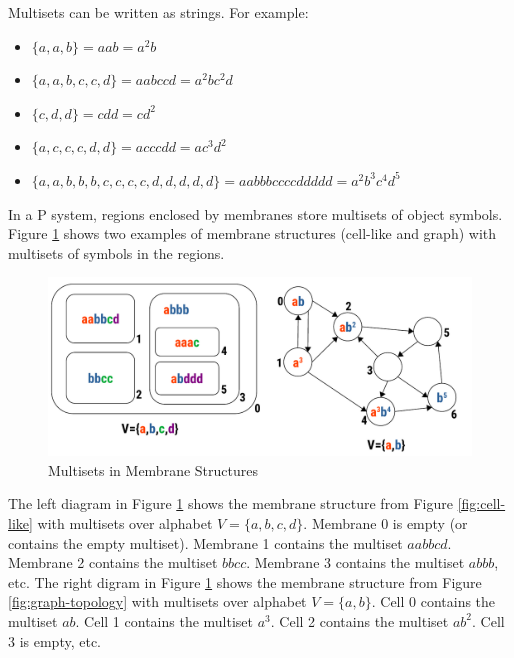\documentclass{article}
\begin{document}
Multisets can be written as strings. For example:

\begin{itemize}
\item $\{a,a,b\} = aab = a^2b$
\item $\{a,a,b,c,c,d\} = aabccd = a^2bc^2d$
\item $\{c,d,d\} = cdd = cd^2$
\item $\{a,c,c,c,d,d\} = acccdd = ac^3d^2$
\item $\{a,a,b,b,b,c,c,c,c,d,d,d,d,d\}= aabbbccccddddd=a^2b^3c^4d^5$
\end{itemize}

In a P system, regions enclosed by membranes store multisets of object symbols. Figure 
\ref{fig:multisets-on-membranes} shows two examples of membrane structures (cell-like and graph) 
with multisets of symbols in the  regions.

\begin{figure}[H]
\begin{center}
\includegraphics[scale=0.55]{figures/zzz-multisets-on-membranes.pdf}
\caption{Multisets in Membrane Structures}
\label{fig:multisets-on-membranes}
\end{center}
\end{figure}

The left diagram in Figure \ref{fig:multisets-on-membranes} shows the membrane structure from Figure
\ref{fig:cell-like} with multisets over alphabet $V=\{a,b,c,d\}$. Membrane 0 is empty (or contains 
the empty multiset). Membrane 1 contains the multiset $aabbcd$. Membrane 2 contains the multiset
$bbcc$. Membrane 3 contains the multiset $abbb$, etc. The right digram in Figure 
\ref{fig:multisets-on-membranes} shows the membrane structure from Figure \ref{fig:graph-topology} 
with multisets over alphabet $V=\{a,b\}$. Cell 0 contains the multiset $ab$. Cell 1 contains the 
multiset $a^3$. Cell 2 contains the multiset $ab^2$. Cell 3 is empty, etc. 

\end{document}
